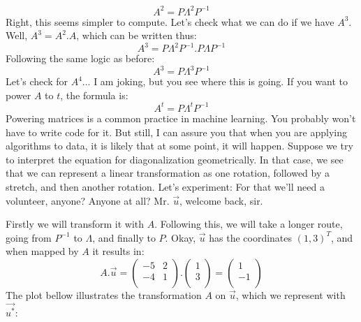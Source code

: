 \documentclass[600paper, 11pt,twoside,openany]{kdp}
\begin{document}
\[A^2  = P \Lambda^2 P^{-1}\]
\indent Right, this seems simpler to compute. Let’s check what we can do if we have $A^3$. Well, $A^3 = A^2.A$, which can be written thus:
\[A^3  = P \Lambda^2 P^{-1}. P \Lambda P^{-1}\]
\indent Following the same logic as before:
\[A^3  = P \Lambda^3 P^{-1}\]
\indent Let’s check for $A^4$... I am joking, but you see where this is going. If you want to power $A$ to $t$, the formula is:
\[A^t =  P \Lambda^t P^{-1}\]
\indent Powering matrices is a common practice in machine learning. You probably won’t have to write code for it. But still, I can assure you that when you are applying algorithms to data, it is likely that at some point, it will happen. Suppose we try to interpret the equation for diagonalization geometrically. In that case, we see that we can represent a linear transformation as one rotation, followed by a stretch, and then another rotation. Let’s experiment: For that we’ll need a volunteer, anyone? Anyone at all? Mr. $\overrightarrow{u}$, welcome back, sir. 
\par 
\vspace{-3pt}
\indent Firstly we will transform it with $A$. Following this, we will take a longer route, going from $P^{−1}$ to $\Lambda$, and finally to $P$. Okay, $\overrightarrow{u}$ has the coordinates $(1,3)^T$, and when mapped by $A$ it results in:
\[A.\overrightarrow{u} = \begin{pmatrix}
-5 & 2 \\
-4 & 1 \\
\end{pmatrix}.\begin{pmatrix}
1 \\
3  \\
\end{pmatrix} = \begin{pmatrix}
1 \\
-1  \\
\end{pmatrix}
\]
\indent The plot bellow illustrates the transformation $A$ on $\overrightarrow{u}$, which we represent with $\overrightarrow{u^*}$:
\newpage
\end{document}
